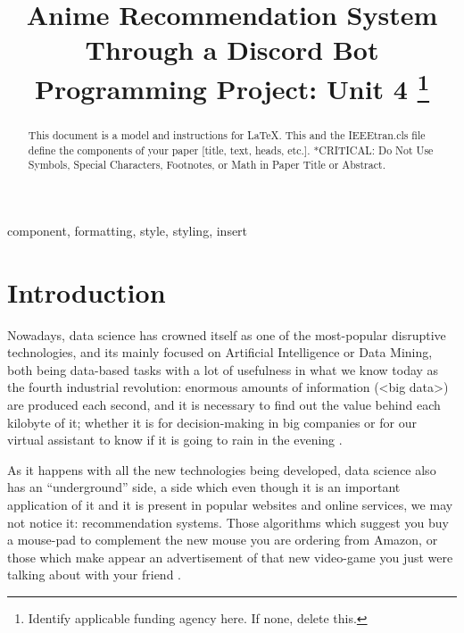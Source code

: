 \documentclass[conference]{IEEEtran}
\begin{document}
\newcommand{\SubItem}[1]{
	{\setlength\itemindent{15pt} \item[-] #1}
}
\title{Anime Recommendation System Through a Discord Bot\\
{\footnotesize \textsuperscript{}Programming Project: Unit 4}
\thanks{Identify applicable funding agency here. If none, delete this.}
}

\author{
\and
{}
\and
{}
}

\maketitle

\begin{abstract}
This document is a model and instructions for \LaTeX.
This and the IEEEtran.cls file define the components of your paper [title, text, heads, etc.]. *CRITICAL: Do Not Use Symbols, Special Characters, Footnotes, 
or Math in Paper Title or Abstract.
\end{abstract}

\begin{IEEEkeywords}
component, formatting, style, styling, insert
\end{IEEEkeywords}

\section{Introduction}
Nowadays, data science has crowned itself as one of the most-popular disruptive technologies, and its mainly focused on Artificial Intelligence or Data Mining, both being data-based tasks with a lot of usefulness in what we know today as the fourth industrial revolution: enormous amounts of information (<big data>) are produced each second, and it is necessary to find out the value behind each kilobyte of it; whether it is for decision-making in big companies or for our virtual assistant to know if it is going to rain in the evening \cite{b1}.  

As it happens with all the new technologies being developed, data science also has an “underground” side, a side which even though it is an important application of it and it is present in popular websites and online services, we may not notice it: recommendation systems. Those algorithms which suggest you buy a mouse-pad to complement the new mouse you are ordering from Amazon, or those which make appear an advertisement of that new video-game you just were talking about with your friend \cite{b2}. 
\end{document}
